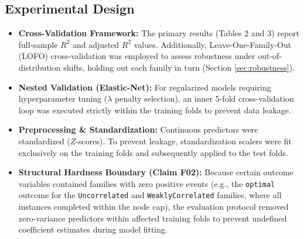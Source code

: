 \documentclass[11pt,a4paper]{article}
\begin{document}
\subsection{Experimental Design}
\begin{itemize}
  \item \textbf{Cross-Validation Framework:} The primary results (Tables 2 and 3) report full-sample $R^2$ and adjusted $R^2$ values. Additionally, Leave-One-Family-Out (LOFO) cross-validation was employed to assess robustness under out-of-distribution shifts, holding out each family in turn (Section \ref{sec:robustness}).
  \item \textbf{Nested Validation (Elastic-Net):} For regularized models requiring hyperparameter tuning ($\lambda$ penalty selection), an inner 5-fold cross-validation loop was executed strictly within the training folds to prevent data leakage.
  \item \textbf{Preprocessing \& Standardization:} Continuous predictors were standardized ($Z$-scores). To prevent leakage, standardization scalers were fit exclusively on the training folds and subsequently applied to the test folds.
  \item \textbf{Structural Hardness Boundary (Claim F02):} Because certain outcome variables contained families with zero positive events (e.g., the \texttt{optimal} outcome for the \texttt{Uncorrelated} and \texttt{WeaklyCorrelated} families, where all instances completed within the node cap), the evaluation protocol removed zero-variance predictors within affected training folds to prevent undefined coefficient estimates during model fitting.
\end{itemize}
\end{document}
